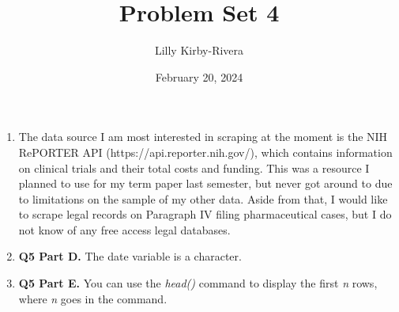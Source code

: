 \documentclass{article}
\title{Problem Set 4}
\author{Lilly Kirby-Rivera}
\date{February 20, 2024}
\begin{document}
\maketitle

\begin{enumerate}
    \item The data source I am most interested in scraping at the moment is the NIH RePORTER API (https://api.reporter.nih.gov/), which contains information on clinical trials and their total costs and funding. This was a resource I planned to use for my term paper last semester, but never got around to due to limitations on the sample of my other data. Aside from that, I would like to scrape legal records on Paragraph IV filing pharmaceutical cases, but I do not know of any free access legal databases.
    \item \textbf{Q5 Part D.} The date variable is a character.
    \item \textbf{Q5 Part E.} You can use the \textit{head()} command to display the first \textit{n} rows, where \textit{n} goes in the command.
\end{enumerate}
\end{document}
